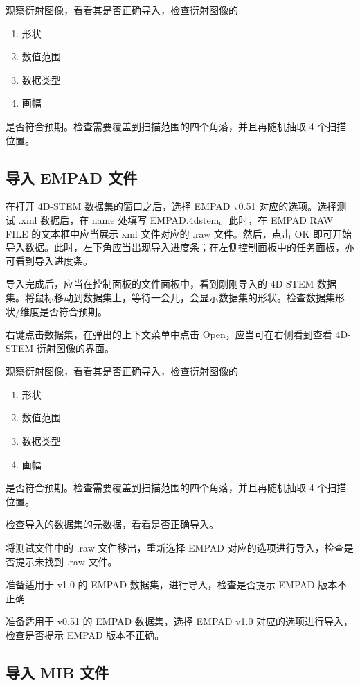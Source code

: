 \documentclass[a4paper,12pt]{report}	%
\begin{document}
观察衍射图像，看看其是否正确导入，检查衍射图像的
\begin{enumerate}
    \item 形状 
    \item 数值范围
    \item 数据类型 
    \item 画幅
\end{enumerate} 
是否符合预期。检查需要覆盖到扫描范围的四个角落，并且再随机抽取 4 个扫描位置。

\subsection{导入 EMPAD 文件}

在打开 4D-STEM 数据集的窗口之后，选择 EMPAD v0.51 对应的选项。选择测试 .xml 数据后，在 name 处填写 EMPAD.4dstem。此时，在 EMPAD RAW FILE 的文本框中应当展示 xml 文件对应的 .raw 文件。然后，点击 OK 即可开始导入数据。此时，左下角应当出现导入进度条；在左侧控制面板中的任务面板，亦可看到导入进度条。

导入完成后，应当在控制面板的文件面板中，看到刚刚导入的 4D-STEM 数据集。将鼠标移动到数据集上，等待一会儿，会显示数据集的形状。检查数据集形状/维度是否符合预期。

右键点击数据集，在弹出的上下文菜单中点击 Open，应当可在右侧看到查看 4D-STEM 衍射图像的界面。

观察衍射图像，看看其是否正确导入，检查衍射图像的
\begin{enumerate}
    \item 形状 
    \item 数值范围
    \item 数据类型 
    \item 画幅
\end{enumerate} 
是否符合预期。检查需要覆盖到扫描范围的四个角落，并且再随机抽取 4 个扫描位置。

检查导入的数据集的元数据，看看是否正确导入。

将测试文件中的 .raw 文件移出，重新选择 EMPAD 对应的选项进行导入，检查是否提示未找到 .raw 文件。

准备适用于 v1.0 的 EMPAD 数据集，进行导入，检查是否提示 EMPAD 版本不正确

准备适用于 v0.51 的 EMPAD 数据集，选择 EMPAD v1.0 对应的选项进行导入，检查是否提示 EMPAD 版本不正确。

\subsection{导入 MIB 文件}
\end{document}
